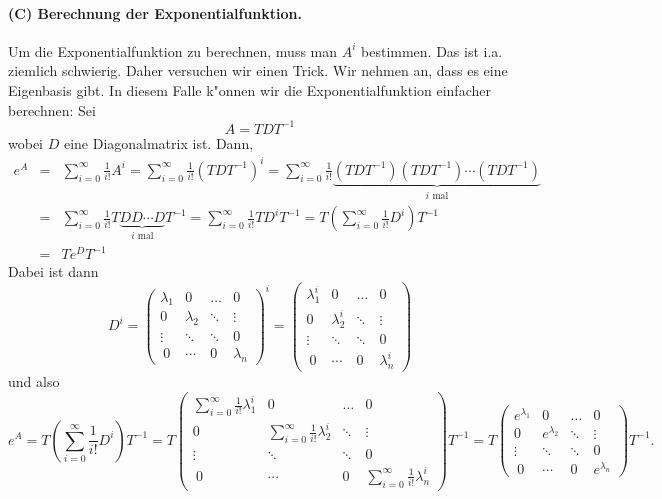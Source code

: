 \paragraph{(C)  Berechnung der Exponentialfunktion.} Um die Exponentialfunktion 
zu berechnen, muss man $A^i$ bestimmen. Das ist i.a. ziemlich 
schwierig. Daher versuchen wir einen Trick. Wir nehmen an, dass es eine Eigenbasis 
gibt. In diesem Falle k"onnen wir die Exponentialfunktion einfacher berechnen: Sei
$$ A = TDT^{-1}$$
wobei $D$ eine Diagonalmatrix ist. Dann,
\begin{eqnarray*}
e^{A} 
&=& \sum_{i=0}^\infty \frac 1 {i!} A^i = \sum_{i=0}^\infty \frac 1 {i!} (TDT^{-1})^i 
= \sum_{i=0}^\infty \frac 1 {i!} \underbrace{(TDT^{-1})(TDT^{-1})\cdots(TDT^{-1})}_{i \mbox{ mal}}\\
&= &\sum_{i=0}^\infty \frac 1 {i!}T \underbrace {DD \cdots D}_{i \mbox{ mal}}T^{-1}
= \sum_{i=0}^\infty \frac 1 {i!} T  D^iT^{-1}
= T \left(\sum_{i=0}^\infty \frac 1 {i!} D^i\right)T^{-1}\\
&= &T e^{D}T^{-1}
\end{eqnarray*}
Dabei ist dann
$$ D^i = 
\left(\begin{array}{cccc}
\lambda_1 & 0 &\dots & 0\\
0 & \lambda_2&\ddots &\vdots\\
 \vdots   &    \ddots                &\ddots & 0\\\
0 &\cdots &0&\lambda_n
\end{array}\right)^i
= 
\left(\begin{array}{cccc}
\lambda_1^i & 0 &\dots & 0\\
0 & \lambda_2^i&\ddots &\vdots\\
 \vdots   &    \ddots                &\ddots & 0\\\
0 &\cdots &0&\lambda_n^i
\end{array}\right)
$$
und also
$$ e^{A} = T \left(\sum_{i=0}^\infty \frac 1 {i!} D^i\right)T^{-1}
= T 
\left(\begin{array}{cccc}
\sum_{i=0}^\infty \frac 1 {i!}\lambda_1^i & 0 &\dots & 0\\
0 & \sum_{i=0}^\infty \frac 1 {i!}\lambda_2^i&\ddots &\vdots\\
 \vdots   &    \ddots                &\ddots & 0\\\
0 &\cdots &0&\sum_{i=0}^\infty \frac 1 {i!}\lambda_n^i
\end{array}\right)
T^{-1}
= T \left(\begin{array}{cccc}
e^{\lambda_1} & 0 &\dots & 0\\
0 & e^{\lambda_2}&\ddots &\vdots\\
 \vdots   &    \ddots                &\ddots & 0\\\
0 &\cdots &0&e^{\lambda_n}
\end{array}\right)
T^{-1}.
$$
